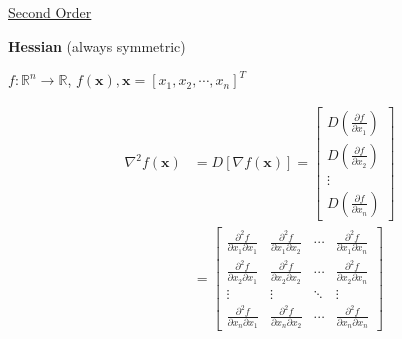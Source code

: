 {\large \underline{Second Order}}

\textbf{Hessian} (always symmetric)

$f: \mathbb{R}^{n} \rightarrow \mathbb{R}$, $f(\boldsymbol{x}), \boldsymbol{x}=\left[x_{1}, x_{2}, \cdots, x_{n}\right]^{T}$

\begin{align*}
{\nabla ^2}f({\bm{x}}) 
&= D\left[ {\nabla f({\bm{x}})} \right] = \left[ {\begin{array}{*{20}{c}}
{D\left( {\frac{{\partial f}}{{\partial {x_1}}}} \right)}\\
{D\left( {\frac{{\partial f}}{{\partial {x_2}}}} \right)}\\
 \vdots \\
{D\left( {\frac{{\partial f}}{{\partial {x_n}}}} \right)}
\end{array}} \right]\\
&= \left[ {\begin{array}{*{20}{c}}
{\frac{{{\partial ^2}f}}{{\partial {x_1}\partial {x_1}}}}&{\frac{{{\partial ^2}f}}{{\partial {x_1}\partial {x_2}}}}& \cdots &{\frac{{{\partial ^2}f}}{{\partial {x_1}\partial {x_n}}}}\\
{\frac{{{\partial ^2}f}}{{\partial {x_2}\partial {x_1}}}}&{\frac{{{\partial ^2}f}}{{\partial {x_2}\partial {x_2}}}}& \cdots &{\frac{{{\partial ^2}f}}{{\partial {x_2}\partial {x_n}}}}\\
 \vdots & \vdots & \ddots & \vdots \\
{\frac{{{\partial ^2}f}}{{\partial {x_n}\partial {x_1}}}}&{\frac{{{\partial ^2}f}}{{\partial {x_n}\partial {x_2}}}}& \cdots &{\frac{{{\partial ^2}f}}{{\partial {x_n}\partial {x_n}}}}
\end{array}} \right]
\end{align*}
















